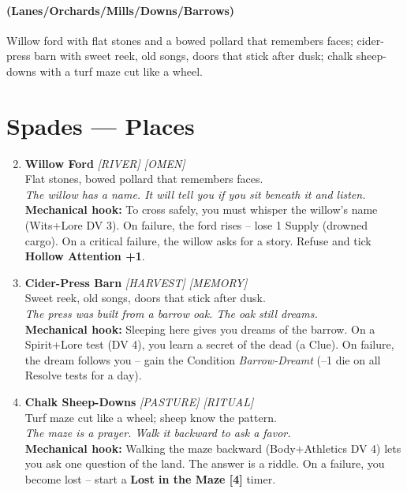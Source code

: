 \paragraph*{(Lanes/Orchards/Mills/Downs/Barrows)} Willow ford with flat stones and a bowed pollard that remembers faces; cider-press barn with sweet reek, old songs, doors that stick after dusk; chalk sheep-downs with a turf maze cut like a wheel.

\section*{Spades --- Places}
\label{sec:aelaerem-places}
\begin{enumerate}
\setcounter{enumi}{1}
\item \textbf{Willow Ford} \hfill \textit{[RIVER] [OMEN]} \\
  Flat stones, bowed pollard that remembers faces. \\
  \textit{The willow has a name. It will tell you if you sit beneath it and listen.} \\
  \textbf{Mechanical hook:} To cross safely, you must whisper the willow's name (Wits+Lore DV 3). On failure, the ford rises -- lose 1 Supply (drowned cargo). On a critical failure, the willow asks for a story. Refuse and tick \textbf{Hollow Attention +1}.

\item \textbf{Cider-Press Barn} \hfill \textit{[HARVEST] [MEMORY]} \\
  Sweet reek, old songs, doors that stick after dusk. \\
  \textit{The press was built from a barrow oak. The oak still dreams.} \\
  \textbf{Mechanical hook:} Sleeping here gives you dreams of the barrow. On a Spirit+Lore test (DV 4), you learn a secret of the dead (a Clue). On failure, the dream follows you -- gain the Condition \textit{Barrow-Dreamt} (--1 die on all Resolve tests for a day).

\item \textbf{Chalk Sheep-Downs} \hfill \textit{[PASTURE] [RITUAL]} \\
  Turf maze cut like a wheel; sheep know the pattern. \\
  \textit{The maze is a prayer. Walk it backward to ask a favor.} \\
  \textbf{Mechanical hook:} Walking the maze backward (Body+Athletics DV 4) lets you ask one question of the land. The answer is a riddle. On a failure, you become lost -- start a \textbf{Lost in the Maze [4]} timer.


\end{enumerate}
